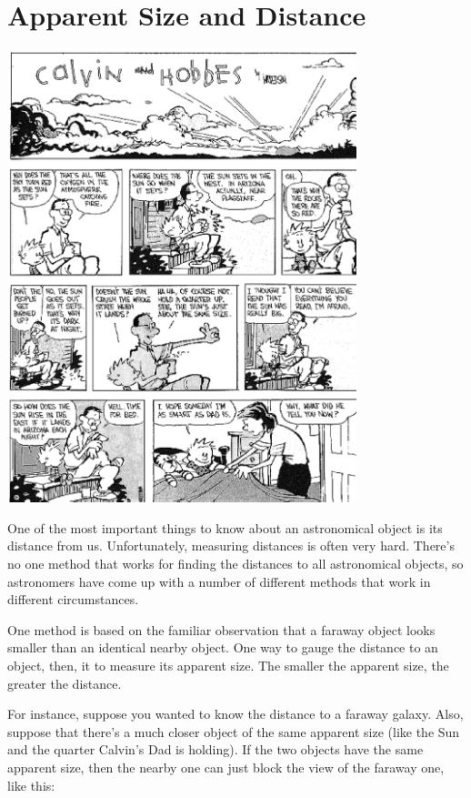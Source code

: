 \section{Apparent Size and Distance}

\makelabheader %

\answerspace{0.5in}
\centerline{\includegraphics[width=4in]{localdistance/calvin-sun.eps}}
\answerspace{0.5in}

One of the most important things to know about an astronomical
object is its distance from us.  Unfortunately, measuring distances
is often very hard.  There's no one method that works for
finding the distances to all astronomical objects, so 
astronomers have come up with a number of different
methods that work in different circumstances.

One method is based on the familiar observation that a 
faraway object looks smaller than an identical nearby object.
One way to gauge the distance to an object, then, it to measure
its apparent size.  The smaller the apparent size, the greater
the distance.

\pagebreak[4]

For instance, suppose you wanted to know the distance to a faraway
galaxy.  Also, suppose that there's a much closer object of the
same apparent size (like the Sun and the quarter Calvin's Dad is holding).
If the two objects have the same apparent size, then the nearby one
can just block the view of the faraway one, like this:


